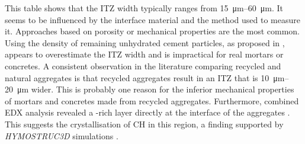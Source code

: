 This table shows that the \ac{ITZ} width typically ranges from \qtyrange{15}{60}{\micro\meter}.
It seems to be influenced by the interface material and the method used to measure it.
Approaches based on porosity or mechanical properties are the most common.
Using the density of remaining unhydrated cement particles, as proposed in \cite{torsaeter.2015}, appears to overestimate the \ac{ITZ} width and is impractical for real mortars or concretes.
A consistent observation in the literature comparing recycled and natural aggregates is that recycled aggregates result in an \ac{ITZ} that is \qtyrange{10}{20}{\micro\meter} wider.
This is probably one reason for the inferior mechanical properties of mortars and concretes made from recycled aggregates.
Furthermore, combined \ac{EDX} analysis revealed a -rich layer directly at the interface of the aggregates \cite{li.2012, tian.2018}.
This suggests the crystallisation of \ac{CH} in this region, a finding supported by \textit{HYMOSTRUC3D} simulations \cite{gao.2014}.
